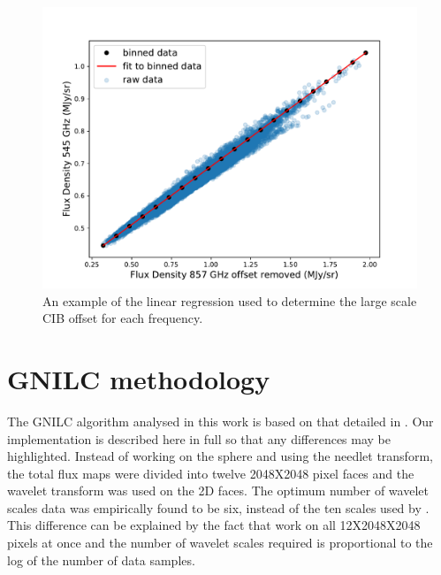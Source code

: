 \documentclass[a4paper,fleqn,usenatbib]{mnras}
\begin{document}
\begin{figure}
\centering
\includegraphics[width=0.8\linewidth]{ciboffsetEx}
\caption{An example of the linear regression used to determine the large scale CIB offset for each frequency.}
\label{fig:ciboffsetLinear}
\end{figure}

\section{GNILC methodology}\label{sec:apB}

The GNILC algorithm analysed in this work is based on that detailed in \citet{gnilc}. Our implementation is described here in full so that any differences may be highlighted. Instead of working on the sphere and using the needlet transform, the total flux maps were divided into twelve 2048X2048 pixel faces and the wavelet transform was used on the 2D faces. The optimum number of wavelet scales data was empirically found to be six, instead of the ten scales used by \citet{gnilc}. This difference can be explained by the fact that \citet{gnilc} work on all 12X2048X2048 pixels at once and the number of wavelet scales required is proportional to the log of the number of data samples. 
\end{document}
